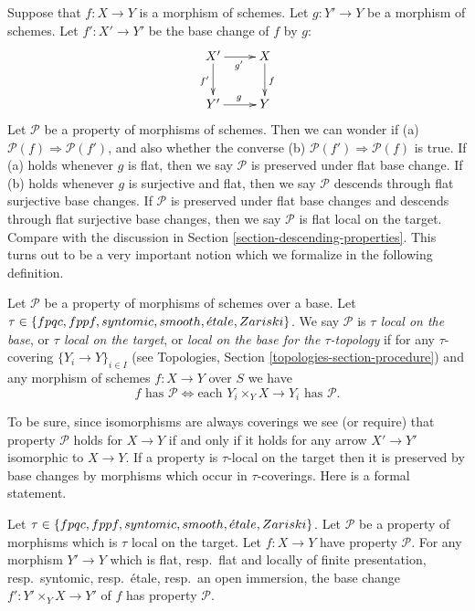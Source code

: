 \noindent
Suppose that $f : X \to Y$ is a morphism of schemes.
Let $g : Y' \to Y$ be a morphism of schemes.
Let $f' : X' \to Y'$ be the base change of $f$ by $g$:
$$
\xymatrix{
X' \ar[d]_{f'} \ar[r]_{g'} & X \ar[d]^f \\
Y' \ar[r]^g & Y
}
$$
Let $\mathcal{P}$ be a property of morphisms of schemes.
Then we can wonder if (a) $\mathcal{P}(f) \Rightarrow \mathcal{P}(f')$,
and also whether the converse (b) $\mathcal{P}(f') \Rightarrow \mathcal{P}(f)$
is true. If (a) holds whenever $g$ is flat, then we say $\mathcal{P}$
is preserved under flat base change. If (b) holds whenever $g$ is
surjective and flat, then we say $\mathcal{P}$ descends through
flat surjective base changes. If $\mathcal{P}$ is preserved under
flat base changes and descends through flat surjective base changes,
then we say $\mathcal{P}$ is flat local on the target.
Compare with the discussion in
Section \ref{section-descending-properties}.
This turns out to be a very important notion which
we formalize in the following definition.

\begin{definition}
\label{definition-property-morphisms-local}
Let $\mathcal{P}$ be a property of morphisms of schemes over a base.
Let $\tau \in \{fpqc, fppf, syntomic, smooth, {\acute{e}tale}, Zariski\}$.
We say $\mathcal{P}$ is {\it $\tau$ local on the base}, or
{\it $\tau$ local on the target}, or
{\it local on the base for the $\tau$-topology} if for any
$\tau$-covering $\{Y_i \to Y\}_{i \in I}$ (see
Topologies, Section \ref{topologies-section-procedure})
and any morphism of schemes $f : X \to Y$ over $S$ we
have
$$
f \text{ has }\mathcal{P}
\Leftrightarrow
\text{each }Y_i \times_Y X \to Y_i\text{ has }\mathcal{P}.
$$
\end{definition}

\noindent
To be sure, since isomorphisms are always coverings
we see (or require) that property $\mathcal{P}$ holds for $X \to Y$
if and only if it holds for any arrow $X' \to Y'$ isomorphic to $X \to Y$.
If a property is $\tau$-local on the target then it is preserved
by base changes by morphisms which occur in $\tau$-coverings. Here
is a formal statement.

\begin{lemma}
\label{lemma-pullback-property-local-target}
Let $\tau \in \{fpqc, fppf, syntomic, smooth, {\acute{e}tale}, Zariski\}$.
Let $\mathcal{P}$ be a property of morphisms which is $\tau$ local
on the target. Let $f : X \to Y$ have property $\mathcal{P}$.
For any morphism $Y' \to Y$ which is
flat, resp.\ flat and locally of finite presentation, resp.\ syntomic,
resp.\ \'etale, resp.\ an open immersion, the base change
$f' : Y' \times_Y X \to Y'$ of $f$ has property $\mathcal{P}$.
\end{lemma}

